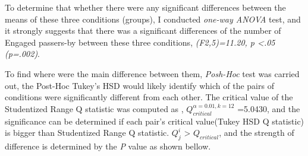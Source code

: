 \begin{table}[H]
\caption{Number of engaged passers-by in three weeks}
\label{tab:engagedofthreeweeks}
\centering
{}
\end{table}

To determine that whether there were any significant differences between the means of these three conditions (groups), I conducted \emph{one-way ANOVA} test, and it strongly suggests that there was a significant differences of the number of Engaged passers-by between these three conditions,
 \emph{(F2,5)=11.20, p <.05 (p=.002)}.

To find where were the main difference between them, \emph{Posh-Hoc} test was carried out, the Post-Hoc Tukey’s HSD would likely identify which of the pairs of conditions were significantly different from each other. The critical value of the Studentized Range Q statistic was computed as , ${Q}_{critical}^{\alpha=0.01,k=12}$ =5.0430, and the significance can be determined if each pair’s critical value(Tukey HSD Q statistic) is bigger than Studentized Range Q statistic. ${Q}_{j}^{i }$ > ${Q}_{critical}$, and the strength of difference is determined by the \emph{P} value as shown bellow.



\begin{table}[H]
\caption{Post-Hoc Tukey’s HSD}
\label{tab:engage-non-posthoctukey}
\centering
{}
\end{table}

